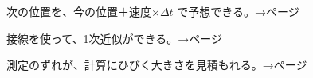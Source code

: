 \begin{furikaeri}
\begin{checklist}
\item 次の位置を、今の位置＋速度×$\Delta t$ で予想できる。\hfill{\footnotesize\sffamily\color{bkTheme}→\pageref{bk:5-8:tsugi}ページ}
\item 接線を使って、1次近似ができる。\hfill{\footnotesize\sffamily\color{bkTheme}→\pageref{bk:5-8:sessen}ページ}
\item 測定のずれが、計算にひびく大きさを見積もれる。\hfill{\footnotesize\sffamily\color{bkTheme}→\pageref{bk:5-8:gosa}ページ}
\end{checklist}
\end{furikaeri}

